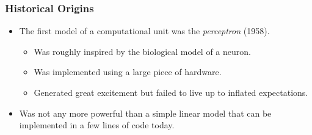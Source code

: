 \begin{frame}
\frametitle{Historical Origins}
\begin{itemize}
\item The first  model of a computational unit was the {\em
perceptron} (1958).
\begin{itemize}
\item Was roughly inspired by the biological model of a neuron.
\item Was implemented using a large piece of hardware.
\item Generated great excitement but failed to live up to inflated expectations.
\end{itemize}
\item Was not any more powerful than a simple linear model that can
be implemented in a  few lines of code today.
\end{itemize}
\end{frame}






